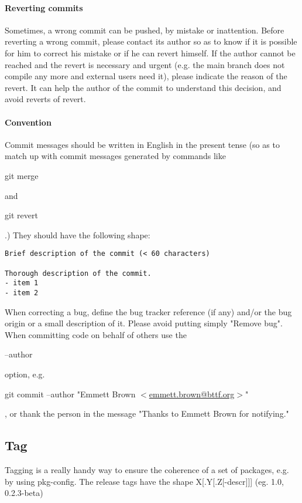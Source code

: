\paragraph{Reverting commits}

Sometimes, a wrong commit can be pushed, by mistake or inattention.
Before reverting a wrong commit, please contact its author so as to know if it is possible for him to correct his mistake or if he can revert himself.
If the author cannot be reached and the revert is necessary and urgent (e.g. the main branch does not compile any more and external users need it), please indicate the reason of the revert. 
It can help the author of the commit to understand this decision, and avoid reverts of revert.

\paragraph{Convention}
Commit messages should be written in English in the present tense 
(so as to match up with commit messages generated by commands like \begin{tt}git merge\end{tt} and \begin{tt}git revert\end{tt}.)
They should have the following shape:
\begin{verbatim}
Brief description of the commit (< 60 characters)

Thorough description of the commit.
- item 1
- item 2
\end{verbatim}

When correcting a bug, define the bug tracker reference (if any) and/or the bug origin or a small description of it.
Please avoid putting simply "Remove bug".\\

When committing code on behalf of others use the \begin{tt}{--author}\end{tt} option, e.g. \begin{tt}git commit --author "Emmett Brown $<$\url{emmett.brown@bttf.org}$>$"\end{tt},
or thank the person in the message "Thanks to Emmett Brown for notifying."

\subsection{Tag}
Tagging is a really handy way to ensure the coherence of a set of packages, e.g. by using pkg-config.
The release tags have the shape X[.Y[.Z[-descr]]] (eg. 1.0, 0.2.3-beta)


